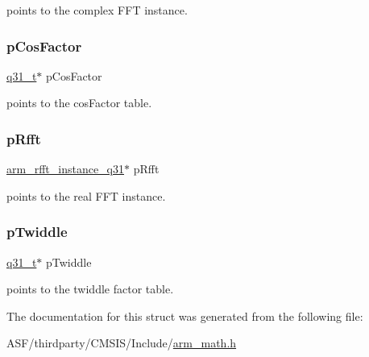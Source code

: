points to the complex F\+FT instance. \mbox{\label{structarm__dct4__instance__q31_af06acf18dc6547fc29aba2eb68cc63f0}} 
\subsubsection{\texorpdfstring{pCosFactor}{pCosFactor}}
{\footnotesize\ttfamily \mbox{\hyperlink{arm__math_8h_adc89a3547f5324b7b3b95adec3806bc0}{q31\+\_\+t}}$\ast$ p\+Cos\+Factor}

points to the cos\+Factor table. \mbox{\label{structarm__dct4__instance__q31_a16c74f8496e1691e62da3c57e0c676eb}} 
\subsubsection{\texorpdfstring{pRfft}{pRfft}}
{\footnotesize\ttfamily \mbox{\hyperlink{structarm__rfft__instance__q31}{arm\+\_\+rfft\+\_\+instance\+\_\+q31}}$\ast$ p\+Rfft}

points to the real F\+FT instance. \mbox{\label{structarm__dct4__instance__q31_a2505b7d5ec077b244c712797a5253b6d}} 
\subsubsection{\texorpdfstring{pTwiddle}{pTwiddle}}
{\footnotesize\ttfamily \mbox{\hyperlink{arm__math_8h_adc89a3547f5324b7b3b95adec3806bc0}{q31\+\_\+t}}$\ast$ p\+Twiddle}

points to the twiddle factor table. 

The documentation for this struct was generated from the following file\+:\begin{DoxyCompactItemize}
\item 
A\+S\+F/thirdparty/\+C\+M\+S\+I\+S/\+Include/\mbox{\hyperlink{arm__math_8h}{arm\+\_\+math.\+h}}\end{DoxyCompactItemize}
